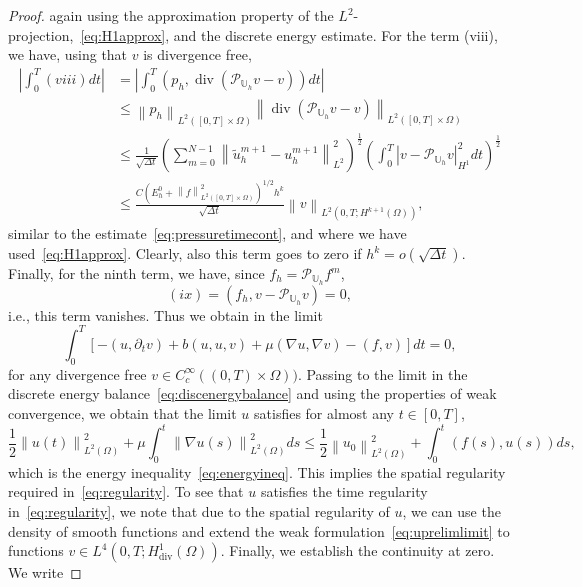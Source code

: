 \documentclass[10pt,letterpaper]{amsart}
\newcommand{\tu}{\widetilde{u}}
\newcommand\norm[1]{\left\lVert#1\right\rVert}
\newcommand{\Grad}{\nabla}
\newcommand{\Div}{\operatorname{div}}
\newcommand{\dom}{\Omega}
\newcommand{\Uh}{\mathbb{U}_h}
\newcommand{\PUh}{\mathcal{P}_{\Uh}}
\theoremstyle{definition}{\newtheorem{definition}[lemma]{Definition}}
\numberwithin{equation}{section}
\begin{document}
\begin{proof}
	again using the approximation property of the $L^2$-projection,~\eqref{eq:H1approx}, and the discrete energy estimate. 
	For the term (viii), we have, using that $v$ is divergence free,
	\begin{equation}\label{eq:pressuretermestimate}
		\begin{split}
		\left|\int_0^T (viii) dt\right|& =	\left|\int_0^T(p_h,\Div(\PUh v-v)) dt\right|\\
		&\leq  \norm{p_h}_{L^2([0,T]\times \dom)}\norm{\Div(\PUh v-v)}_{L^2([0,T]\times\dom)}\\
			& \leq \frac{1}{\sqrt{\Delta t}}\left(\sum_{m=0}^{N-1}\norm{\tu^{m+1}_h-u^{m+1}_h}_{L^2}^2\right)^{\frac12}\left(\int_0^T|v-\PUh v|_{H^1}^2 dt\right)^{\frac12} \\
			&\leq \frac{C (E_h^0+\norm{f}_{L^2([0,T]\times\dom)}^2)^{1/2} h^k}{\sqrt{\Delta t}}\norm{v}_{L^2(0,T;H^{k+1}(\dom))}, 
		\end{split}
	\end{equation}
	similar to the estimate~\eqref{eq:pressuretimecont}, and where we have used~\eqref{eq:H1approx}.  Clearly, also this term goes to zero if $h^k=o(\sqrt{\Delta t})$. 
	Finally, for the ninth term, we have, since $f_h=\PUh f^m$,
	\begin{equation*}
		(ix) = (f_h,v-\PUh v) = 0,
	\end{equation*}
	i.e., this term vanishes.
	Thus we obtain in the limit
	\begin{equation}
		\label{eq:uprelimlimit}
		\int_0^T\left[-( u ,\partial_t v)+ b(u,u,v)+\mu(\Grad u,\Grad v) -(f,v)\right] dt = 0,
	\end{equation}
	for any divergence free $v\in C^\infty_c((0,T)\times\dom))$. Passing to the limit in the discrete energy balance~\eqref{eq:discenergybalance} and using the properties of weak convergence, we obtain that the limit $u$ satisfies for almost any $t\in [0,T]$,
	\begin{equation}\label{eq:energylimit}
	\frac{1}{2}\norm{u(t)}_{L^2(\dom)}^2 +\mu\int_0^t\norm{\Grad u(s)}_{L^2(\dom)}^2 ds \leq \frac12\norm{u_0}_{L^2(\dom)}^2 + \int_0^t(f(s),u(s)) ds,
	\end{equation}
	which is the energy inequality~\eqref{eq:energyineq}. This implies the spatial regularity required in~\eqref{eq:regularity}. To see that $u$ satisfies the time regularity in~\eqref{eq:regularity}, we note that due to the spatial regularity of $u$, we can use the density of smooth functions and extend the weak formulation~\eqref{eq:uprelimlimit} to functions $v\in L^4(0,T;H^1_{\Div}(\dom))$. Finally, we establish the continuity at zero. We write

\end{proof}
\end{document}
